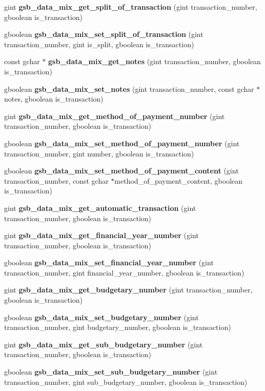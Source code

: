 \begin{DoxyCompactItemize}
\item 
gint {\bf gsb\_\-data\_\-mix\_\-get\_\-split\_\-of\_\-transaction} (gint transaction\_\-number, gboolean is\_\-transaction)
\item 
gboolean {\bf gsb\_\-data\_\-mix\_\-set\_\-split\_\-of\_\-transaction} (gint transaction\_\-number, gint is\_\-split, gboolean is\_\-transaction)
\item 
const gchar $\ast$ {\bf gsb\_\-data\_\-mix\_\-get\_\-notes} (gint transaction\_\-number, gboolean is\_\-transaction)
\item 
gboolean {\bf gsb\_\-data\_\-mix\_\-set\_\-notes} (gint transaction\_\-number, const gchar $\ast$notes, gboolean is\_\-transaction)
\item 
gint {\bf gsb\_\-data\_\-mix\_\-get\_\-method\_\-of\_\-payment\_\-number} (gint transaction\_\-number, gboolean is\_\-transaction)
\item 
gboolean {\bf gsb\_\-data\_\-mix\_\-set\_\-method\_\-of\_\-payment\_\-number} (gint transaction\_\-number, gint number, gboolean is\_\-transaction)
\item 
gboolean {\bf gsb\_\-data\_\-mix\_\-set\_\-method\_\-of\_\-payment\_\-content} (gint transaction\_\-number, const gchar $\ast$method\_\-of\_\-payment\_\-content, gboolean is\_\-transaction)
\item 
gint {\bf gsb\_\-data\_\-mix\_\-get\_\-automatic\_\-transaction} (gint transaction\_\-number, gboolean is\_\-transaction)
\item 
gint {\bf gsb\_\-data\_\-mix\_\-get\_\-financial\_\-year\_\-number} (gint transaction\_\-number, gboolean is\_\-transaction)
\item 
gboolean {\bf gsb\_\-data\_\-mix\_\-set\_\-financial\_\-year\_\-number} (gint transaction\_\-number, gint financial\_\-year\_\-number, gboolean is\_\-transaction)
\item 
gint {\bf gsb\_\-data\_\-mix\_\-get\_\-budgetary\_\-number} (gint transaction\_\-number, gboolean is\_\-transaction)
\item 
gboolean {\bf gsb\_\-data\_\-mix\_\-set\_\-budgetary\_\-number} (gint transaction\_\-number, gint budgetary\_\-number, gboolean is\_\-transaction)
\item 
gint {\bf gsb\_\-data\_\-mix\_\-get\_\-sub\_\-budgetary\_\-number} (gint transaction\_\-number, gboolean is\_\-transaction)
\item 
gboolean {\bf gsb\_\-data\_\-mix\_\-set\_\-sub\_\-budgetary\_\-number} (gint transaction\_\-number, gint sub\_\-budgetary\_\-number, gboolean is\_\-transaction)

\end{DoxyCompactItemize}
